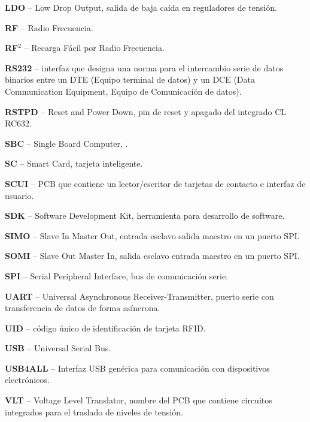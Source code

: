 \begin{glosario}
{\bf{LDO}} – Low Drop Output, salida de baja caída en reguladores de tensión.

{\bf{RF}} – Radio Frecuencia.

{\bf{RF$^{2}$}} – Recarga Fácil por Radio Frecuencia.

{\bf{RS232}} – interfaz que designa una norma para el intercambio serie de datos binarios entre un DTE (Equipo terminal de datos) y un DCE (Data Communication Equipment, Equipo de Comunicación de datos).

{\bf{RSTPD}} – Reset and Power Down, pin de reset y apagado del integrado CL RC632.

{\bf{SBC}} – Single Board Computer, .

{\bf{SC}} – Smart Card,  tarjeta inteligente.

{\bf{SCUI}} – PCB que contiene un lector/escritor de tarjetas de contacto e interfaz de usuario.

{\bf{SDK}} – Software Development Kit,  herramienta para desarrollo de software.

{\bf{SIMO}} – Slave In Master Out, entrada esclavo salida maestro en un puerto SPI.

{\bf{SOMI}} – Slave Out Master In, salida esclavo entrada maestro en un puerto SPI.

{\bf{SPI}} – Serial Peripheral Interface, bus de comunicación serie.

{\bf{UART}} – Universal Asynchronous Receiver-Transmitter, puerto serie con transferencia de datos de forma asíncrona.

{\bf{UID}} – código único de identificación de tarjeta RFID.

{\bf{USB}} – Universal Serial Bus.

{\bf{USB4ALL}} – Interfaz USB genérica para comunicación con dispositivos electrónicos.

{\bf{VLT}} – Voltage Level Translator, nombre del PCB que contiene circuitos integrados para el traslado de niveles de tensión.


\end{glosario}